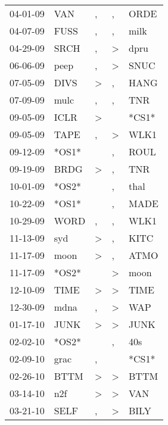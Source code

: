 \begin{supertabular}{lllll}
 04-01-09 &    VAN &                , &                , &   ORDE \\
 04-07-09 &   FUSS &                , &                , &   milk \\
 04-29-09 &   SRCH &                , &     \textgreater &   dpru \\
 06-06-09 &   peep &                , &     \textgreater &   SNUC \\
 07-05-09 &   DIVS &     \textgreater &                , &   HANG \\
 07-09-09 &   mulc &                , &                , &    TNR \\
 09-05-09 &   ICLR &     \textgreater &                  &  *CS1* \\
 09-05-09 &   TAPE &                , &     \textgreater &   WLK1 \\
 09-12-09 &  *OS1* &                  &                , &   ROUL \\
 09-19-09 &   BRDG &     \textgreater &                , &    TNR \\
 10-01-09 &  *OS2* &                  &                , &   thal \\
 10-22-09 &  *OS1* &                  &                , &   MADE \\
 10-29-09 &   WORD &                , &                , &   WLK1 \\
 11-13-09 &    syd &     \textgreater &                , &   KITC \\
 11-17-09 &   moon &     \textgreater &                , &   ATMO \\
 11-17-09 &  *OS2* &                  &     \textgreater &   moon \\
 12-10-09 &   TIME &     \textgreater &     \textgreater &   TIME \\
 12-30-09 &   mdna &                , &     \textgreater &    WAP \\
 01-17-10 &   JUNK &     \textgreater &     \textgreater &   JUNK \\
 02-02-10 &  *OS2* &                  &                , &    40s \\
 02-09-10 &   grac &                , &                  &  *CS1* \\
 02-26-10 &   BTTM &     \textgreater &     \textgreater &   BTTM \\
 03-14-10 &    n2f &     \textgreater &     \textgreater &    VAN \\
 03-21-10 &   SELF &                , &     \textgreater &   BILY \\

\end{supertabular}
